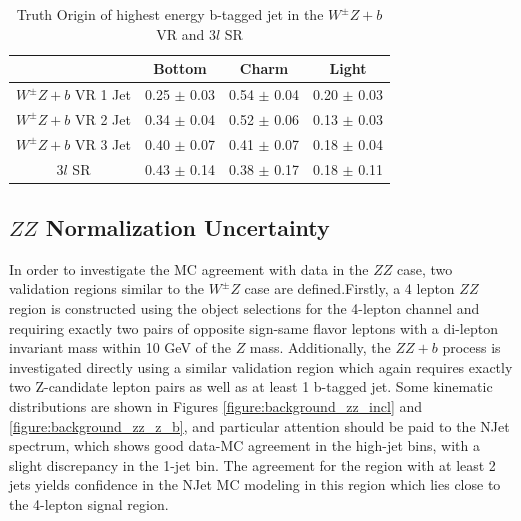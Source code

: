 \begin{table}[htbp]
\centering 
\begin{tabular}{|c|c|c|c|} 
  \hline
  & Bottom  & Charm & Light \\
  \hline
  $W^{\pm}Z+b$ VR 1 Jet& 0.25 $\pm$ 0.03 & 0.54  $\pm$ 0.04 & 0.20 $\pm$ 0.03 \\ 
  $W^{\pm}Z+b$ VR 2 Jet& 0.34 $\pm$ 0.04 & 0.52  $\pm$ 0.06 & 0.13 $\pm$ 0.03 \\ 
  $W^{\pm}Z+b$ VR 3 Jet& 0.40 $\pm$ 0.07 & 0.41  $\pm$ 0.07 & 0.18 $\pm$ 0.04 \\
  3$l$ SR              & 0.43 $\pm$ 0.14 & 0.38  $\pm$ 0.17 & 0.18 $\pm$ 0.11 \\
  \hline 
\end{tabular}
\caption{Truth Origin of highest energy b-tagged jet in the $W^{\pm}Z+b$ VR and 3$l$ SR} 
\label{table:wz_truth}
\end{table} 

\subsection{$ZZ$ Normalization Uncertainty}

In order to investigate the MC agreement with data in the $ZZ$ case, two validation regions similar to the $W^{\pm}Z$ case are defined.Firstly, a 4 lepton $ZZ$ region is constructed using the object selections for the 4-lepton channel and requiring exactly two pairs of 
opposite sign-same flavor leptons with a di-lepton invariant mass within 10 GeV of the $Z$ mass. Additionally, the $ZZ+b$ process 
is investigated directly using a similar validation region which again requires exactly two Z-candidate lepton pairs as well as at least 1 b-tagged jet. Some kinematic distributions are shown in Figures \ref{figure:background_zz_incl} and \ref{figure:background_zz_z_b}, and particular attention should be paid to the NJet spectrum, which shows good data-MC agreement in the high-jet bins, with a slight discrepancy in the 1-jet bin. The agreement for the region with at least 2 jets yields confidence in the NJet MC modeling in this region which lies close to the 4-lepton signal region. 

